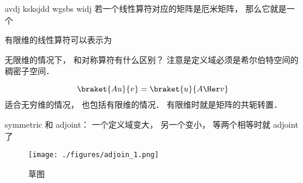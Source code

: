 
\begin{issues}
\issueDraft
\end{issues}



avdj ksksjdd wgsbs widj  若一个线性算符对应的矩阵是厄米矩阵， 那么它就是一个

有限维的线性算符可以表示为

无限维的情况下， 和对称算符有什么区别？ 注意是定义域必须是希尔伯特空间的稠密子空间．


\begin{equation}
\braket{Au}{v} = \braket{u}{A\Her v}
\end{equation}
适合无穷维的情况， 也包括有限维的情况． 有限维时就是矩阵的共轭转置．

symmetric 和 adjoint： 一个定义域变大， 另一个变小， 等两个相等时就 adjoint 了
\begin{figure}[ht]
\centering
\texttt{[image: ./figures/adjoin\_1.png]}
\caption{草图} \label{adjoin_fig1}
\end{figure}
